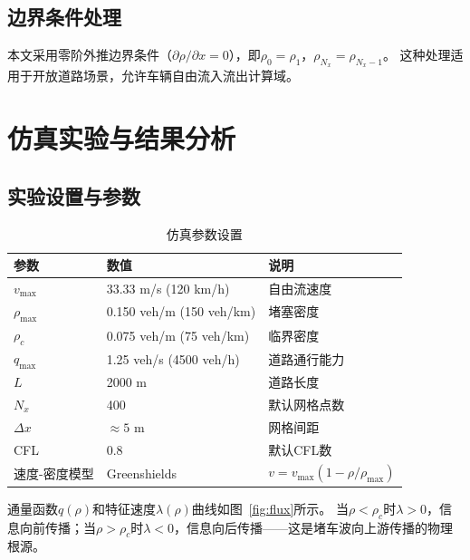 \documentclass[12pt,a4paper]{ctexart}
\begin{document}
\subsection{边界条件处理}

本文采用零阶外推边界条件（$\partial\rho/\partial x = 0$），即$\rho_0 = \rho_1$，$\rho_{N_x} = \rho_{N_x-1}$。
这种处理适用于开放道路场景，允许车辆自由流入流出计算域。

\newpage

\section{仿真实验与结果分析}

\subsection{实验设置与参数}

\begin{table}[H]
    \centering
    \caption{仿真参数设置}
    \label{tab:params}
    \begin{tabular}{@{}lll@{}}
        \toprule
        \textbf{参数} & \textbf{数值} & \textbf{说明} \\
        \midrule
        $v_{\max}$ & 33.33 m/s (120 km/h) & 自由流速度 \\
        $\rho_{\max}$ & 0.150 veh/m (150 veh/km) & 堵塞密度 \\
        $\rho_c$ & 0.075 veh/m (75 veh/km) & 临界密度 \\
        $q_{\max}$ & 1.25 veh/s (4500 veh/h) & 道路通行能力 \\
        $L$ & 2000 m & 道路长度 \\
        $N_x$ & 400 & 默认网格点数 \\
        $\Delta x$ & $\approx 5$ m & 网格间距 \\
        CFL & 0.8 & 默认CFL数 \\
        速度-密度模型 & Greenshields & $v = v_{\max}(1-\rho/\rho_{\max})$ \\
        \bottomrule
    \end{tabular}
\end{table}

通量函数$q(\rho)$和特征速度$\lambda(\rho)$曲线如图~\ref{fig:flux}所示。
当$\rho < \rho_c$时$\lambda > 0$，信息向前传播；当$\rho > \rho_c$时$\lambda < 0$，信息向后传播——这是堵车波向上游传播的物理根源。
\end{document}
